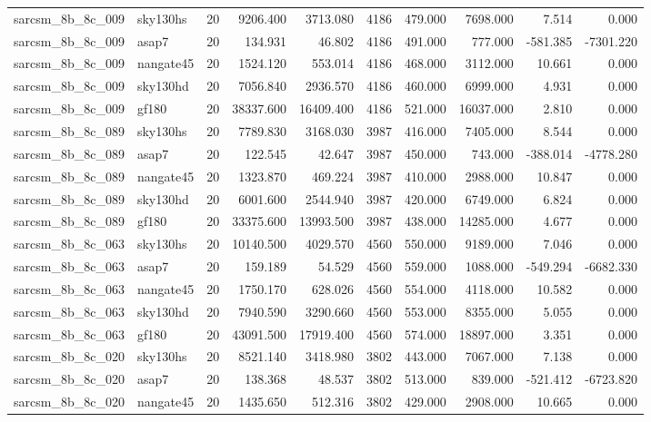\begin{longtable}{llrrrrrrrr}
sarcsm\_8b\_8c\_009 & sky130hs & 20 & 9206.400 & 3713.080 & 4186 & 479.000 & 7698.000 & 7.514 & 0.000 \\
sarcsm\_8b\_8c\_009 & asap7 & 20 & 134.931 & 46.802 & 4186 & 491.000 & 777.000 & -581.385 & -7301.220 \\
sarcsm\_8b\_8c\_009 & nangate45 & 20 & 1524.120 & 553.014 & 4186 & 468.000 & 3112.000 & 10.661 & 0.000 \\
sarcsm\_8b\_8c\_009 & sky130hd & 20 & 7056.840 & 2936.570 & 4186 & 460.000 & 6999.000 & 4.931 & 0.000 \\
sarcsm\_8b\_8c\_009 & gf180 & 20 & 38337.600 & 16409.400 & 4186 & 521.000 & 16037.000 & 2.810 & 0.000 \\
sarcsm\_8b\_8c\_089 & sky130hs & 20 & 7789.830 & 3168.030 & 3987 & 416.000 & 7405.000 & 8.544 & 0.000 \\
sarcsm\_8b\_8c\_089 & asap7 & 20 & 122.545 & 42.647 & 3987 & 450.000 & 743.000 & -388.014 & -4778.280 \\
sarcsm\_8b\_8c\_089 & nangate45 & 20 & 1323.870 & 469.224 & 3987 & 410.000 & 2988.000 & 10.847 & 0.000 \\
sarcsm\_8b\_8c\_089 & sky130hd & 20 & 6001.600 & 2544.940 & 3987 & 420.000 & 6749.000 & 6.824 & 0.000 \\
sarcsm\_8b\_8c\_089 & gf180 & 20 & 33375.600 & 13993.500 & 3987 & 438.000 & 14285.000 & 4.677 & 0.000 \\
sarcsm\_8b\_8c\_063 & sky130hs & 20 & 10140.500 & 4029.570 & 4560 & 550.000 & 9189.000 & 7.046 & 0.000 \\
sarcsm\_8b\_8c\_063 & asap7 & 20 & 159.189 & 54.529 & 4560 & 559.000 & 1088.000 & -549.294 & -6682.330 \\
sarcsm\_8b\_8c\_063 & nangate45 & 20 & 1750.170 & 628.026 & 4560 & 554.000 & 4118.000 & 10.582 & 0.000 \\
sarcsm\_8b\_8c\_063 & sky130hd & 20 & 7940.590 & 3290.660 & 4560 & 553.000 & 8355.000 & 5.055 & 0.000 \\
sarcsm\_8b\_8c\_063 & gf180 & 20 & 43091.500 & 17919.400 & 4560 & 574.000 & 18897.000 & 3.351 & 0.000 \\
sarcsm\_8b\_8c\_020 & sky130hs & 20 & 8521.140 & 3418.980 & 3802 & 443.000 & 7067.000 & 7.138 & 0.000 \\
sarcsm\_8b\_8c\_020 & asap7 & 20 & 138.368 & 48.537 & 3802 & 513.000 & 839.000 & -521.412 & -6723.820 \\
sarcsm\_8b\_8c\_020 & nangate45 & 20 & 1435.650 & 512.316 & 3802 & 429.000 & 2908.000 & 10.665 & 0.000 \\

\end{longtable}
